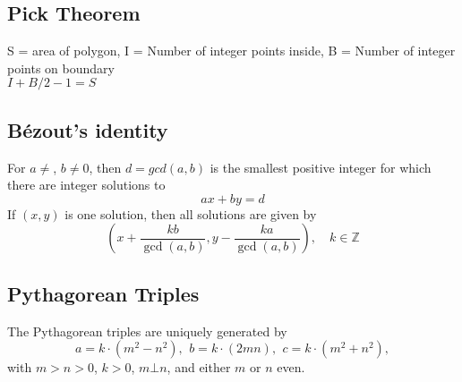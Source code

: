 	\subsection{Pick Theorem}
		S = area of polygon, I = Number of integer points inside, B = Number of integer points on boundary \\
		$I + B/2 - 1 = S$
    	\subsection{Bézout's identity}
	For $a \neq $, $b \neq 0$, then $d=gcd(a,b)$ is the smallest positive integer for which there are integer solutions to
	$$ax+by=d$$
	If $(x,y)$ is one solution, then all solutions are given by
	$$\left(x+\frac{kb}{\gcd(a,b)}, y-\frac{ka}{\gcd(a,b)}\right), \quad k\in\mathbb{Z}$$

    \subsection{Pythagorean Triples}
    The Pythagorean triples are uniquely generated by
    \[ a=k\cdot (m^{2}-n^{2}),\ \,b=k\cdot (2mn),\ \,c=k\cdot (m^{2}+n^{2}), \]
    with $m > n > 0$, $k > 0$, $m \bot n$, and either $m$ or $n$ even.





